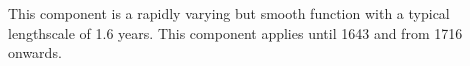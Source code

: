 This component is a rapidly varying but smooth function with a typical lengthscale of 1.6 years.
This component applies until 1643 and from 1716 onwards.